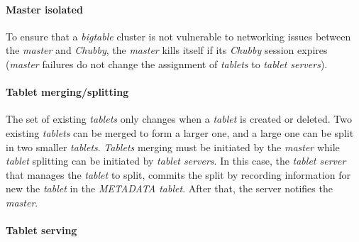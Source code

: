 \paragraph{Master isolated}
To ensure that a \emph{bigtable} cluster is not vulnerable to networking issues
between the \emph{master} and \emph{Chubby}, the \emph{master} kills itself if
its \emph{Chubby} session expires (\emph{master} failures do not change the
assignment of \emph{tablets} to \emph{tablet servers}).

\paragraph{Tablet merging/splitting}
The set of existing \emph{tablets} only changes when a \emph{tablet} is created
or deleted. Two existing \emph{tablets} can be merged to form a larger one, and
a large one can be split in two smaller \emph{tablets}. \emph{Tablets} merging
must be initiated by the \emph{master} while \emph{tablet} splitting can be
initiated by \emph{tablet servers}. In this case, the \emph{tablet server} that
manages the \emph{tablet} to split, commits the split by recording information
for new the \emph{tablet} in the \emph{METADATA tablet}. After that, the server
notifies the \emph{master}.

\paragraph{Tablet serving}\mbox{}

